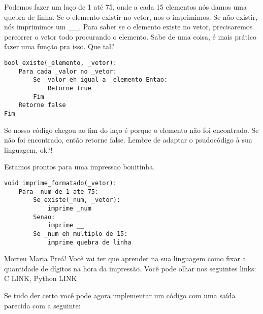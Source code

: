 \documentclass[12pt]{article}
\begin{document}
Podemos fazer um laço de 1 até 75, onde a cada 15 elementos nós damos uma quebra
de linha. Se o elemento existir no vetor, nos o imprimimos. Se não existir, nós
imprimimos um \_\_. Para saber se o elemento existe no vetor, precisaremos
percorrer o vetor todo procurando o elemento. Sabe de uma coisa, é mais prático
fazer uma função pra isso. Que tal?

\begin{lstlisting}
bool existe(_elemento, _vetor):
	Para cada _valor no _vetor:
		Se _valor eh igual a _elemento Entao:
			Retorne true
		Fim
	Retorne false
Fim

\end{lstlisting}

Se nosso código chegou ao fim do laço é porque o elemento não foi encontrado. Se
não foi encontrado, então retorne false. Lembre de adaptar o psudocódigo à sua
linguagem, ok?!

Estamos prontos para uma impressao bonitinha.

\begin{lstlisting}
void imprime_formatado(_vetor):
	Para _num de 1 ate 75:
		Se existe(_num, _vetor):
			imprime _num
		Senao:
			imprime __
		Se _num eh multiplo de 15:
			imprime quebra de linha
\end{lstlisting}

Morreu Maria Preá! Você vai ter que aprender na sua linguagem como fixar
a quantidade de dígitos na hora da impressão. Você pode olhar nos seguintes
links: C LINK, Python LINK

Se tudo der certo você pode agora implementar um código com uma saída parecida
com a seguinte:
\end{document}
